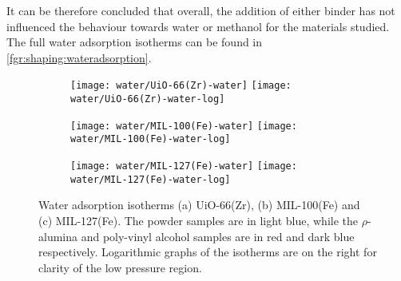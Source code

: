 It can be therefore concluded that overall, the addition of either 
binder has not influenced the behaviour towards water or 
methanol for the materials studied. The full water adsorption isotherms
can be found in \autoref{fgr:shaping:wateradsorption}.

\begin{figure}[p!]
    \centering

    \begin{subfigure}{\linewidth}
        \centering
        \parbox{0.1\linewidth}{\caption{}\label{fgr:shaping:wateruio66}}%
        \texttt{[image: water/UiO-66(Zr)-water]}%
        \texttt{[image: water/UiO-66(Zr)-water-log]}%
    \end{subfigure}

    \begin{subfigure}{\linewidth}
        \centering
        \parbox{0.1\linewidth}{\caption{}\label{fgr:shaping:watermil100}}%
        \texttt{[image: water/MIL-100(Fe)-water]}%
        \texttt{[image: water/MIL-100(Fe)-water-log]}%
    \end{subfigure}

    \begin{subfigure}{\linewidth}
        \centering
        \parbox{0.1\linewidth}{\caption{}\label{fgr:shaping:watermil127}}%
        \texttt{[image: water/MIL-127(Fe)-water]}%
        \texttt{[image: water/MIL-127(Fe)-water-log]}%
    \end{subfigure}
    
    \caption{Water adsorption isotherms (a) UiO-66(Zr), 
    (b) MIL-100(Fe) and (c) MIL-127(Fe). The powder samples are in light
    blue, while the \(\rho\)-alumina and poly-vinyl alcohol samples are in red
    and dark blue respectively. Logarithmic graphs of the isotherms are
    on the right for clarity of the low
    pressure region.}%
    \label{fgr:shaping:wateradsorption}
\end{figure}


